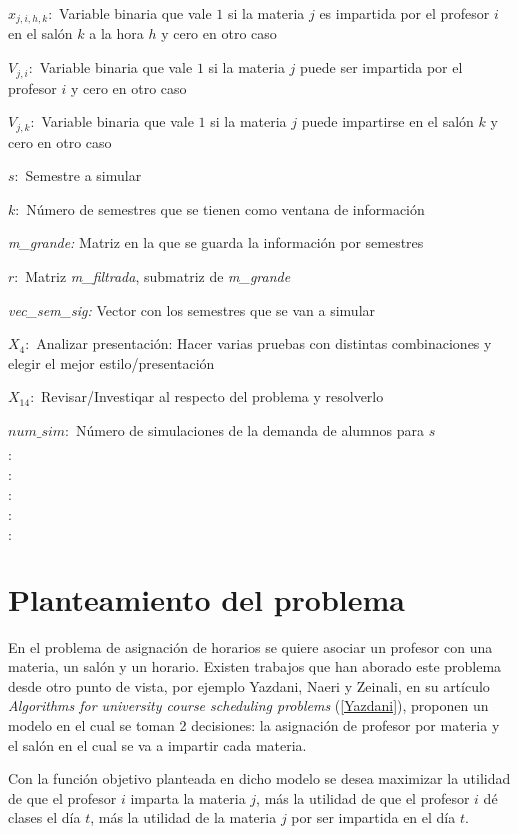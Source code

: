 $x_{j,i,h,k}:$ Variable binaria que vale $1$ si la materia $j$ es impartida por el profesor $i$ en el salón $k$ a la hora $h$ y cero en otro caso

$V_{j,i}:$ Variable binaria que vale $1$ si la materia $j$ puede ser impartida por  el profesor $i$ y cero en otro caso

$V_{j,k}:$ Variable binaria que vale $1$ si la materia $j$ puede impartirse en el salón $k$ y cero en otro caso

$s:$ Semestre a simular

$k:$ Número de semestres que se tienen como ventana de información

\textit{m\_grande:} Matriz en la que se guarda la información por semestres

$r:$ Matriz \textit{m\_filtrada}, submatriz de \textit{m\_grande}

\textit{vec\_sem\_sig:} Vector con los semestres que se van a simular

$X_{4}:$ Analizar presentación: Hacer varias pruebas con distintas combinaciones y elegir el mejor estilo/presentación

$X_{14}:$ Revisar/Investiqar al respecto del problema y resolverlo

$num\_sim:$ Número de simulaciones de la demanda de alumnos para $s$

$:$ 

$:$ 

$:$ 

$:$ 

$:$ 

\section{Planteamiento del problema}

En el problema de asignación de horarios se quiere asociar un profesor con una materia, un salón y un horario. Existen trabajos que han aborado este problema desde otro punto de vista, por ejemplo Yazdani, Naeri y Zeinali, en su artículo \textit{Algorithms for university course scheduling problems} (\ref{Yazdani}), proponen un modelo en el cual se toman 2 decisiones: la asignación de profesor por materia y el salón en el cual se va a impartir cada materia.

Con la función objetivo planteada en dicho modelo se desea maximizar la utilidad de que el profesor $i$ imparta la materia $j$, más la utilidad de que el profesor $i$ dé clases el día $t$, más la utilidad de la materia $j$ por ser impartida en el día $t$.

